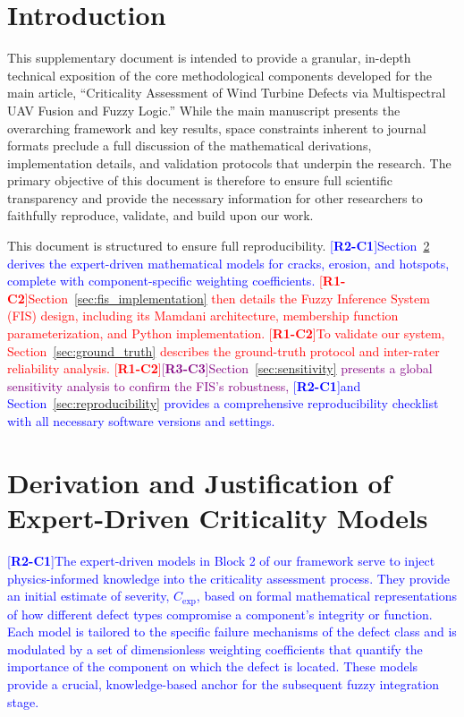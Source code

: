 \documentclass[energies,supfile,submit,pdftex,moreauthors]{Definitions/mdpi}
\newcommand{\revtag}[2]{[\textbf{R#1-C#2}]}
\newcommand{\Rone}[1]{\textcolor{red}{#1}}
\newcommand{\Rtwo}[1]{\textcolor{blue}{#1}}
\newcommand{\Rthree}[1]{\textcolor{purple}{#1}}
\begin{document}
\section{Introduction}
This supplementary document is intended to provide a granular, in-depth technical exposition of the core methodological components developed for the main article, ``Criticality Assessment of Wind Turbine Defects via Multispectral UAV Fusion and Fuzzy Logic.'' While the main manuscript presents the overarching framework and key results, space constraints inherent to journal formats preclude a full discussion of the mathematical derivations, implementation details, and validation protocols that underpin the research. The primary objective of this document is therefore to ensure full scientific transparency and provide the necessary information for other researchers to faithfully reproduce, validate, and build upon our work.

This document is structured to ensure full reproducibility. \Rtwo{\revtag{2}{1}Section~\ref{sec:models} derives the expert-driven mathematical models for cracks, erosion, and hotspots, complete with component-specific weighting coefficients.} \Rone{\revtag{1}{2}Section~\ref{sec:fis_implementation} then details the Fuzzy Inference System (FIS) design, including its Mamdani architecture, membership function parameterization, and Python implementation.} \Rone{\revtag{1}{2}To validate our system, Section~\ref{sec:ground_truth} describes the ground-truth protocol and inter-rater reliability analysis.} \Rone{\revtag{1}{2}}\Rthree{\revtag{3}{3}Section~\ref{sec:sensitivity} presents a global sensitivity analysis to confirm the FIS's robustness,} \Rtwo{\revtag{2}{1}and Section~\ref{sec:reproducibility} provides a comprehensive reproducibility checklist with all necessary software versions and settings.}

\section{Derivation and Justification of Expert-Driven Criticality Models}\label{sec:models}
\Rtwo{\revtag{2}{1}The expert-driven models in Block 2 of our framework serve to inject physics-informed knowledge into the criticality assessment process. They provide an initial estimate of severity, \(C_{\text{exp}}\), based on formal mathematical representations of how different defect types compromise a component's integrity or function. Each model is tailored to the specific failure mechanisms of the defect class and is modulated by a set of dimensionless weighting coefficients that quantify the importance of the component on which the defect is located. These models provide a crucial, knowledge-based anchor for the subsequent fuzzy integration stage.}
\end{document}
